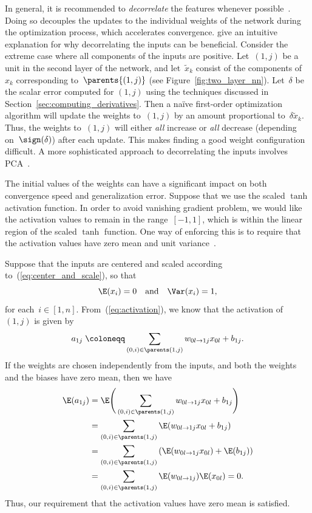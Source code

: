 \documentclass[11pt,a4paper]{article}
\numberwithin{equation}{section}
\newcommand{\weight}[2]{w_{#1 \rightarrow #2}}
\begin{document}
In general, it is recommended to \emph{decorrelate} the features whenever
possible~\citep{lecun-98b}. Doing so decouples the updates to the individual
weights of the network during the optimization process, which accelerates
convergence. \citet{lecun-98b} give an intuitive explanation for why
decorrelating the inputs can be beneficial. Consider the extreme case where all
components of the inputs are positive. Let~$(1, j)$ be a unit in the second
layer of the network, and let~$\tilde{x}_k$ consist of the components of~$x_k$
corresponding to~$\parents{(1, j)}$ (see Figure~\ref{fig:two_layer_nn}).
Let~$\delta$ be the scalar error computed for $(1, j)$ using the techniques
discussed in Section~\ref{sec:computing_derivatives}. Then a na\"{i}ve
first-order optimization algorithm will update the weights to~$(1, j)$ by an
amount proportional to~$\delta \tilde{x}_k$. Thus, the weights to~$(1, j)$ will
either \emph{all} increase or \emph{all} decrease (depending on~$\sign(\delta)$)
after each update. This makes finding a good weight configuration difficult. A
more sophisticated approach to decorrelating the inputs involves
PCA~\citep{lecun-98b, krizhevsky2012imagenet}.

The initial values of the weights can have a significant impact on both
convergence speed and generalization error. Suppose that we use the scaled
$\tanh$ activation function. In order to avoid vanishing gradient problem, we
would like the activation values to remain in the range~$[-1, 1]$, which is
within the linear region of the scaled $\tanh$ function. One way of enforcing
this is to require that the activation values have zero mean and unit
variance~\citep{lecun-98b}.

Suppose that the inputs are centered and scaled according
to~(\ref{eq:center_and_scale}), so that
\[
	\E(x_i) = 0 \quad\text{and}\quad \Var(x_i) = 1,
\]
for each~$i \in [1, n]$. From~(\ref{eq:activation}), we know that the activation
of~$(1, j)$ is given by
\[
	a_{1j} \;\coloneqq \sum_{(0, i) \in \parents(1, j)} \weight{0l}{1j} x_{0l} + b_{1j}.
\]
If the weights are chosen independently from the inputs, and both the weights
and the biases have zero mean, then we have
\begin{align*}
	\E(a_{1j})
	&= \E\Bigg(\sum_{(0, i) \in \parents(1, j)} \weight{0l}{1j} x_{0l} + b_{1j}\Bigg) \\
	&= \sum_{(0, i) \in \parents(1, j)} \E(\weight{0l}{1j} x_{0l} + b_{1j}) \\
	&= \sum_{(0, i) \in \parents(1, j)} \left(\E(\weight{0l}{1j} x_{0l}) + \E(b_{1j})\right) \\
	&= \sum_{(0, i) \in \parents(1, j)} \E(\weight{0l}{1j}) \E(x_{0l}) = 0.
\end{align*}
Thus, our requirement that the activation values have zero mean is satisfied.
\end{document}
